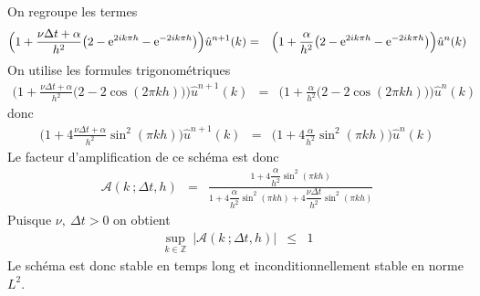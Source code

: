 On regroupe les termes
\begin{eqnarray*}
    \Big(1+\frac{\nu \Delta t+\alpha}{h^2}\big(2-\mathrm{e}^{2ik\pi h}-\mathrm{e}^{-2ik\pi h}\big)\Big)\hat{u}^{n+1}(k) &=& \Big(1+\frac{\alpha}{h^2}\big(2-\mathrm{e}^{2ik\pi h}-\mathrm{e}^{-2ik\pi h}\big)\Big)\hat{u}^{n}(k)
\end{eqnarray*}
On utilise les formules trigonométriques
\begin{eqnarray*}
    \Big(1+\frac{\nu \Delta t+\alpha}{h^2}\big(2-2\cos{(2\pi kh)}\big)\Big)\hat{u}^{n+1}(k) &=& \Big(1+\frac{\alpha}{h^2}\big(2-2\cos{(2\pi kh)}\big)\Big)\hat{u}^{n}(k)
\end{eqnarray*}
donc 
\begin{eqnarray*}
    \Big(1+4\frac{\nu \Delta t+\alpha}{h^2}\sin^2(\pi kh)\Big)\hat{u}^{n+1}(k) &=& \Big(1+4\frac{\alpha}{h^2}\sin^2(\pi kh)\Big)\hat{u}^{n}(k)
\end{eqnarray*}
Le facteur d'amplification de ce schéma est donc
\begin{eqnarray*}
    \mathscr{A}(k \ ; \Delta t ,h) &=& \frac{1 +  4 \dfrac{\alpha}{h^2} \sin^2(\pi k h)}{1+4\dfrac{\alpha}{h^2}\sin^2(\pi k h) + 4 \dfrac{\nu \Delta t}{h^2}\sin^2(\pi k h) }
\end{eqnarray*}
Puisque $\nu, \ \Delta t > 0$ on obtient 
\begin{eqnarray*}
    \sup_{k \in \mathbb{Z}} \ |\mathscr{A}(k \ ; \Delta t ,h)| &\leq& 1
\end{eqnarray*}
Le schéma est donc stable en temps long et inconditionnellement stable en norme $L^2$.

